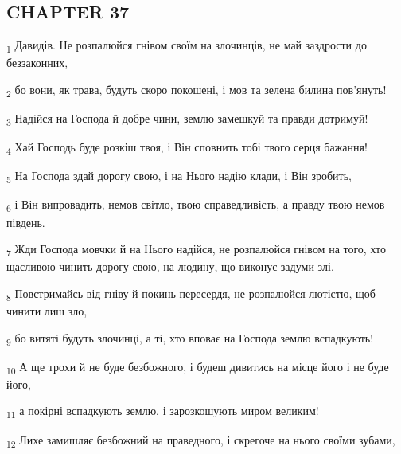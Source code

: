 \subsection{CHAPTER 37}
\begin{tcolorbox}
\textsubscript{1} Давидів. Не розпалюйся гнівом своїм на злочинців, не май заздрости до беззаконних,
\end{tcolorbox}
\begin{tcolorbox}
\textsubscript{2} бо вони, як трава, будуть скоро покошені, і мов та зелена билина пов'януть!
\end{tcolorbox}
\begin{tcolorbox}
\textsubscript{3} Надійся на Господа й добре чини, землю замешкуй та правди дотримуй!
\end{tcolorbox}
\begin{tcolorbox}
\textsubscript{4} Хай Господь буде розкіш твоя, і Він сповнить тобі твого серця бажання!
\end{tcolorbox}
\begin{tcolorbox}
\textsubscript{5} На Господа здай дорогу свою, і на Нього надію клади, і Він зробить,
\end{tcolorbox}
\begin{tcolorbox}
\textsubscript{6} і Він випровадить, немов світло, твою справедливість, а правду твою немов південь.
\end{tcolorbox}
\begin{tcolorbox}
\textsubscript{7} Жди Господа мовчки й на Нього надійся, не розпалюйся гнівом на того, хто щасливою чинить дорогу свою, на людину, що виконує задуми злі.
\end{tcolorbox}
\begin{tcolorbox}
\textsubscript{8} Повстримайсь від гніву й покинь пересердя, не розпалюйся лютістю, щоб чинити лиш зло,
\end{tcolorbox}
\begin{tcolorbox}
\textsubscript{9} бо витяті будуть злочинці, а ті, хто вповає на Господа землю вспадкують!
\end{tcolorbox}
\begin{tcolorbox}
\textsubscript{10} А ще трохи й не буде безбожного, і будеш дивитись на місце його і не буде його,
\end{tcolorbox}
\begin{tcolorbox}
\textsubscript{11} а покірні вспадкують землю, і зарозкошують миром великим!
\end{tcolorbox}
\begin{tcolorbox}
\textsubscript{12} Лихе замишляє безбожний на праведного, і скрегоче на нього своїми зубами,
\end{tcolorbox}
